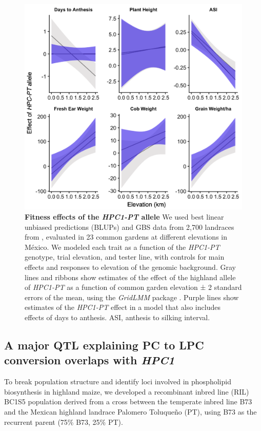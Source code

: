 \documentclass[9pt,twocolumn,twoside,lineno]{biorxiv}
\begin{document}
\begin{figure}[!ht]
\begin{center}
\includegraphics[width=0.4\paperwidth]{Figures/Fig_4.png}
\caption{\textbf{Fitness effects of the \textit{HPC1-PT} allele} 
We used best linear unbiased predictions (BLUPs) and GBS data from 2,700 landraces from \cite{Gates2019-xu}, evaluated in 23 common gardens at different elevations in México. 
We modeled each trait as a function of the \textit{HPC1-PT} genotype, trial elevation, and tester line, with controls for main effects and responses to elevation of the genomic background. 
Gray lines and ribbons show estimates of the effect of the highland allele of \textit{HPC1-PT} as a function of common garden elevation ± 2 standard errors of the mean, using the \textit{GridLMM} package \cite{Runcie2019-Gr}. 
Purple lines show estimates of the \textit{HPC1-PT} effect in a model that also includes effects of days to anthesis. ASI, anthesis to silking interval.}
\label{Fig4}
\end{center}
\end{figure}

\subsection{A major QTL explaining PC to LPC conversion overlaps with \textit{HPC1}} 
To break population structure and identify loci involved in phospholipid biosynthesis in highland maize, we developed a recombinant inbred line (RIL) BC1S5 population derived from a cross between the temperate inbred line B73 and the Mexican highland landrace Palomero Toluqueño (PT), using B73 as the recurrent parent (75\% B73, 25\% PT). 
\end{document}
